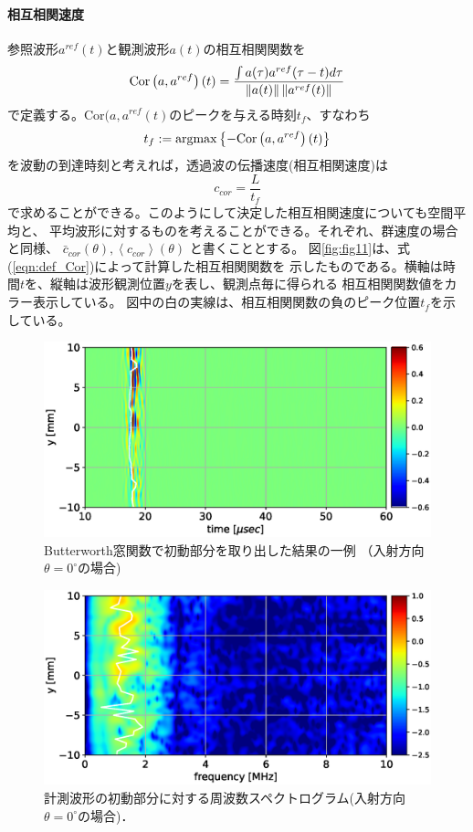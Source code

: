 \paragraph{相互相関速度}
参照波形$a^{ref}(t)$と観測波形$a(t)$の相互相関関数を
\begin{equation}
	{\rm Cor}\left(a,a^{ref}\right)(t)=
	\frac{
	\int a(\tau)a^{ref}(\tau-t) d\tau
	}{
		\left\| a(t)\right\|
		\left\| a^{ref}(t)\right\|
	}
	\label{eqn:def_Cor}
\end{equation}
で定義する。Cor$(a,a^{ref}(t)$のピークを与える時刻$t_{f}$、すなわち
\begin{equation}
	t_{f}:={\rm argmax} \left\{
		-{\rm Cor}\left(a,a^{ref}\right)(t)
		\right\}
	\label{eqn:def_tof}
\end{equation}
を波動の到達時刻と考えれば，透過波の伝播速度(相互相関速度)は
\begin{equation}
	c_{cor}=\frac{L}{t_{f}}
	\label{eqn:}
\end{equation}
で求めることができる。このようにして決定した相互相関速度についても空間平均と、
平均波形に対するものを考えることができる。それぞれ、群速度の場合と同様、
$\bar c_{cor}(\theta), \left< c_{cor}\right>(\theta)$
と書くこととする。
図\ref{fig:fig11}は、式(\ref{eqn:def_Cor})によって計算した相互相関関数を
示したものである。横軸は時間$t$を、縦軸は波形観測位置$y$を表し、観測点毎に得られる
相互相関関数値をカラー表示している。
図中の白の実線は、相互相関関数の負のピーク位置$t_{f}$を示している。
\begin{figure}[h]
	\begin{center}
	\includegraphics[width=0.7\linewidth]{Figs/fig6.eps} 
	\end{center}
	\caption{
		Butterworth窓関数で初動部分を取り出した結果の一例
		（入射方向$\theta=0^{\circ}$の場合)
	} 
	\label{fig:fig6}
\end{figure}
\begin{figure}[h]
	\begin{center}
	\includegraphics[width=0.7\linewidth]{Figs/fig7.eps} 
	\end{center}
	\caption{
		計測波形の初動部分に対する周波数スペクトログラム(入射方向$\theta=0^{\circ}$の場合)．
	} 
	\label{fig:fig7}
\end{figure}

